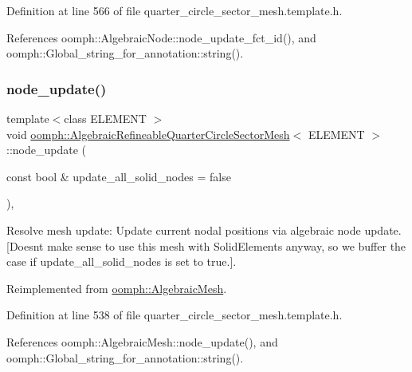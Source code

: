 Definition at line 566 of file quarter\+\_\+circle\+\_\+sector\+\_\+mesh.\+template.\+h.



References oomph\+::\+Algebraic\+Node\+::node\+\_\+update\+\_\+fct\+\_\+id(), and oomph\+::\+Global\+\_\+string\+\_\+for\+\_\+annotation\+::string().

\mbox{\label{classoomph_1_1AlgebraicRefineableQuarterCircleSectorMesh_a32a096b894031167a90bafdab167ffc7}} 
\subsubsection{\texorpdfstring{node\+\_\+update()}{node\_update()}}
{\footnotesize\ttfamily template$<$class E\+L\+E\+M\+E\+NT $>$ \\
void \hyperlink{classoomph_1_1AlgebraicRefineableQuarterCircleSectorMesh}{oomph\+::\+Algebraic\+Refineable\+Quarter\+Circle\+Sector\+Mesh}$<$ E\+L\+E\+M\+E\+NT $>$\+::node\+\_\+update (\begin{DoxyParamCaption}\item[{const bool \&}]{update\+\_\+all\+\_\+solid\+\_\+nodes = {\ttfamily false} }\end{DoxyParamCaption})\hspace{0.3cm}{\ttfamily [inline]}, {\ttfamily [virtual]}}



Resolve mesh update\+: Update current nodal positions via algebraic node update. \mbox{[}Doesn\textquotesingle{}t make sense to use this mesh with Solid\+Elements anyway, so we buffer the case if update\+\_\+all\+\_\+solid\+\_\+nodes is set to true.\mbox{]}. 



Reimplemented from \hyperlink{classoomph_1_1AlgebraicMesh_ad3a5638cacb6df1a47c475bb177b6ed7}{oomph\+::\+Algebraic\+Mesh}.



Definition at line 538 of file quarter\+\_\+circle\+\_\+sector\+\_\+mesh.\+template.\+h.



References oomph\+::\+Algebraic\+Mesh\+::node\+\_\+update(), and oomph\+::\+Global\+\_\+string\+\_\+for\+\_\+annotation\+::string().


